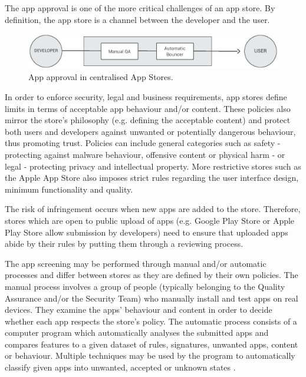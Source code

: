 
The app approval is one of the more critical challenges of an app store. By definition, the app store is a channel between the developer and the user.

\begin{figure}[!ht]
\centering
\includegraphics[width=\textwidth]{diagrams/apps_approval_flow.eps}
\caption{App approval in centralised App Stores.}
\label{fig:app_approval_flow}
\end{figure}

In order to enforce security, legal and business requirements, app stores define limits in terms of acceptable app behaviour and/or content. These policies also mirror the store's philosophy (e.g. defining the acceptable content) and protect both users and developers against unwanted or potentially dangerous behaviour, thus promoting trust. Policies can include general categories such as safety - protecting against malware behaviour, offensive content or physical harm - or legal - protecting privacy and intellectual property. More restrictive stores such as the Apple App Store also imposes strict rules regarding the user interface design, minimum functionality and quality. \cite{GooglePolicyWebsite, ApplePolicyWebsite}


The risk of infringement occurs when new apps are added to the store. Therefore, stores which are open to public upload of apps (e.g. Google Play Store or Apple Play Store allow submission by developers) need to ensure that uploaded apps abide by their rules by putting them through a reviewing process. 

\medskip

The app screening may be performed through manual and/or automatic processes and differ between stores as they are defined by their own policies. The manual process involves a group of people (typically belonging to the Quality Assurance and/or the Security Team) who manually install and test apps on real devices. They examine the apps' behaviour and content in order to decide whether each app respects the store's policy. The automatic process consists of a computer program which automatically analyses the submitted apps and compares features to a given dataset of rules, signatures, unwanted apps, content or behaviour. Multiple techniques may be used by the program to automatically classify given apps into unwanted, accepted or unknown states \cite{Bhattacharya2017}.

